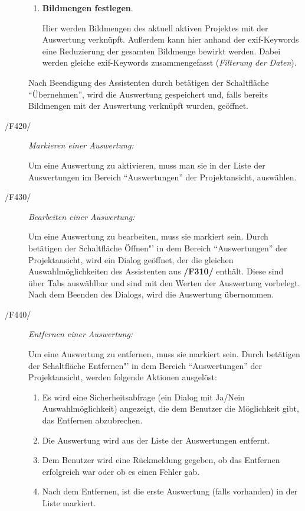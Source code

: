 \begin{description}
\begin{enumerate}
				\item \textbf{Bildmengen festlegen}.\par Hier werden Bildmengen des aktuell aktiven Projektes mit der Auswertung verknüpft. Außerdem kann hier anhand der \gls{exif}-Keywords eine Reduzierung der gesamten Bildmenge bewirkt werden. Dabei werden gleiche \gls{exif}-Keywords zusammengefasst (\textit{Filterung der Daten}).

			\end{enumerate}

			Nach Beendigung des Assistenten durch betätigen der Schaltfläche "`Übernehmen"', wird die Auswertung gespeichert und, falls bereits Bildmengen mit der Auswertung verknüpft wurden, geöffnet.
		
		\item[/F420/] \textit{Markieren einer Auswertung:}\par Um eine Auswertung zu aktivieren, muss man sie in der Liste der Auswertungen im Bereich "`Auswertungen"' der Projektansicht, auswählen.
		
		\item[/F430/] \textit{Bearbeiten einer Auswertung:}\par Um eine Auswertung zu bearbeiten, muss sie markiert sein. Durch betätigen der Schaltfläche Öffnen"' in dem Bereich "`Auswertungen"' der Projektansicht, wird ein Dialog geöffnet, der die gleichen Auswahlmöglichkeiten des Assistenten aus \textbf{/F310/} enthält. Diese sind über Tabs auswählbar und sind mit den Werten der Auswertung vorbelegt. Nach dem Beenden des Dialogs, wird die Auswertung übernommen.
				
		\item[/F440/] \textit{Entfernen einer Auswertung:}\par Um eine Auswertung zu entfernen, muss sie markiert sein. Durch betätigen der Schaltfläche Entfernen"' in dem Bereich "`Auswertungen"' der Projektansicht, werden folgende Aktionen ausgelöst:

			\begin{enumerate}

				\item Es wird eine Sicherheitsabfrage (ein Dialog mit Ja/Nein Auswahlmöglichkeit) angezeigt, die dem Benutzer die Möglichkeit gibt, das Entfernen abzubrechen.

				\item Die Auswertung wird aus der Liste der Auswertungen entfernt.

				\item Dem Benutzer wird eine Rückmeldung gegeben, ob das Entfernen erfolgreich war oder ob es einen Fehler gab.

				\item Nach dem Entfernen, ist die erste Auswertung (falls vorhanden) in der Liste markiert.

			\end{enumerate}
			
	\end{description}

